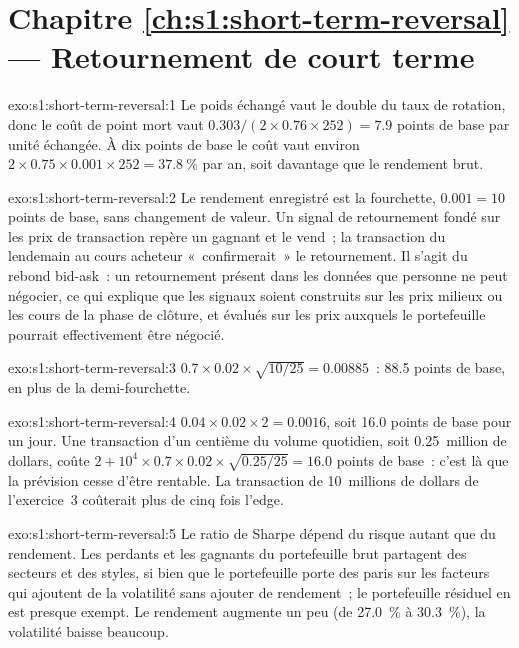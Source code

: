 \section*{Chapitre \ref{ch:s1:short-term-reversal} --- Retournement de court terme}

\begin{solution}{exo:s1:short-term-reversal:1}
Le poids échangé vaut le double du taux de rotation, donc le coût de point mort vaut $0.303/(2 \times 0.76 \times 252) = 7.9$ points de base par unité échangée. À dix points de base
le coût vaut environ $2 \times 0.75 \times 0.001 \times 252 = 37.8~\%$ par an, soit davantage que le rendement brut.
\end{solution}

\begin{solution}{exo:s1:short-term-reversal:2}
Le rendement enregistré est la fourchette, $0.001 = 10$ points de base, sans changement de valeur. Un signal de retournement fondé sur les prix de transaction repère un gagnant et le vend~; la
transaction du lendemain au cours acheteur «~confirmerait~» le retournement. Il s'agit du rebond bid-ask~: un retournement présent dans les données que personne ne peut négocier, ce qui explique que les signaux soient construits sur
les prix milieux ou les cours de la phase de clôture, et évalués sur les prix auxquels le portefeuille pourrait effectivement être négocié.
\end{solution}

\begin{solution}{exo:s1:short-term-reversal:3}
$0.7 \times 0.02 \times \sqrt{10/25} = 0.00885$~: 88.5 points de base, en plus de la demi-fourchette.
\end{solution}

\begin{solution}{exo:s1:short-term-reversal:4}
$0.04 \times 0.02 \times 2 = 0.0016$, soit 16.0 points de base pour un jour. Une transaction d'un centième du volume quotidien, soit 0.25~million de dollars, coûte
$2 + 10^4 \times 0.7 \times 0.02 \times \sqrt{0.25/25} = 16.0$ points de base~: c'est là que la prévision cesse d'être rentable. La transaction de 10~millions de dollars de l'exercice~3 coûterait
plus de cinq fois l'edge.
\end{solution}

\begin{solution}{exo:s1:short-term-reversal:5}
Le ratio de Sharpe dépend du risque autant que du rendement. Les perdants et les gagnants du portefeuille brut partagent des secteurs et des styles, si bien que le portefeuille porte des paris sur les facteurs qui ajoutent
de la volatilité sans ajouter de rendement~; le portefeuille résiduel en est presque exempt. Le rendement augmente un peu (de 27.0~\% à 30.3~\%), la volatilité baisse beaucoup.
\end{solution}

